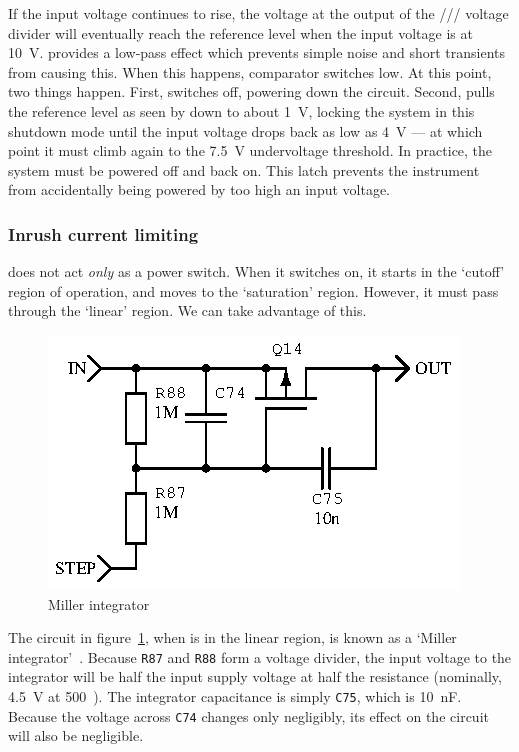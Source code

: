 If the input voltage continues to rise, the voltage at the output of the
/// voltage divider will
eventually reach the reference level when the input voltage is at 10~V.
 provides a low-pass effect which prevents simple noise and short
transients from causing this. When this happens, comparator 
switches low. At this point, two things happen. First,  switches
 off, powering down the circuit. Second,  pulls the
reference level as seen by  down to about 1~V, locking
the system in this shutdown mode until the input voltage drops back as low
as 4~V --- at which point it must climb again to the 7.5~V
undervoltage threshold. In practice, the system must be powered off and back
on. This latch prevents the instrument from accidentally being powered by
too high an input voltage.

\subsubsection{Inrush current limiting}

 does not act \emph{only} as a power switch. When it switches on,
it starts in the `cutoff' region of operation, and moves to the `saturation'
region. However, it must pass through the `linear' region. We can take
advantage of this.

\begin{figure}[H]
\centering
\includegraphics[]{millerint}
\caption{Miller integrator}
\label{fig:miller}
\end{figure}

The circuit in figure~\ref{fig:miller}, when  is in the linear
region, is known as a `Miller integrator'~\cite[pg. 283]{tranckts-sawtooth}.
Because \texttt{R87} and \texttt{R88} form a voltage divider, the input
voltage to the integrator will be half the input supply voltage at half
the resistance (nominally, 4.5~V at 500~\kOhm). The
integrator capacitance is simply \texttt{C75}, which is 10~nF.
Because the voltage across \texttt{C74} changes only negligibly, its effect
on the circuit will also be negligible.

